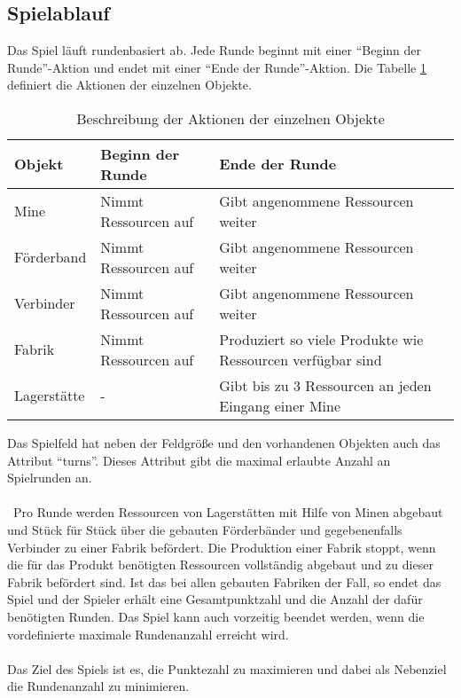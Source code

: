 \subsection{Spielablauf}
Das Spiel läuft rundenbasiert ab. Jede Runde beginnt mit einer “Beginn der Runde”-Aktion und endet mit einer “Ende der Runde”-Aktion.
Die Tabelle \ref{tab:object_actions} definiert die Aktionen der einzelnen Objekte. 
\begin{table}[htp]
\begin{center}
\begin{tabular}{ | p{2cm} | p{5cm} | p{}| } 
	\hline
	\textbf{Objekt}& \textbf{Beginn der Runde} & \textbf{Ende der Runde} \\ \hline
	Mine & Nimmt Ressourcen auf & Gibt angenommene Ressourcen weiter \\ \hline
	Förderband & Nimmt Ressourcen auf & Gibt angenommene Ressourcen weiter \\ \hline
	Verbinder & Nimmt Ressourcen auf & Gibt angenommene Ressourcen weiter \\ \hline
	Fabrik & Nimmt Ressourcen auf & Produziert so viele Produkte wie Ressourcen verfügbar sind \\ \hline
	Lagerstätte & - & Gibt bis zu 3 Ressourcen an jeden Eingang einer Mine \\ \hline
\end{tabular}
\caption{Beschreibung der Aktionen der einzelnen Objekte}\label{tab:object_actions}
\end{center}
\end{table}
Das Spielfeld hat neben der Feldgröße und den vorhandenen Objekten auch das Attribut “turns”. Dieses Attribut gibt die maximal erlaubte Anzahl an Spielrunden an.
\\\\\
Pro Runde werden Ressourcen von Lagerstätten mit Hilfe von Minen abgebaut und Stück für Stück über die gebauten Förderbänder und gegebenenfalls Verbinder zu einer Fabrik befördert. 
Die Produktion einer Fabrik stoppt, wenn die für das Produkt benötigten Ressourcen vollständig abgebaut und zu dieser Fabrik befördert sind.
Ist das bei allen gebauten Fabriken der Fall, so endet das Spiel und der Spieler erhält eine Gesamtpunktzahl und die Anzahl der dafür benötigten Runden. Das Spiel kann auch vorzeitig beendet werden, wenn die vordefinierte maximale Rundenanzahl erreicht wird.
\\\\
Das Ziel des Spiels ist es, die Punktezahl zu maximieren und dabei als Nebenziel die Rundenanzahl zu minimieren.


